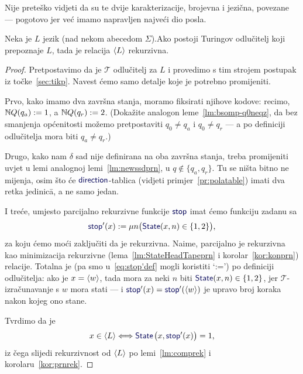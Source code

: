 Nije preteško vidjeti da su te dvije karakterizacije, brojevna i jezična, povezane --- pogotovo jer već imamo napravljen najveći dio posla.

\begin{teorem}[{name=[rekurzivnost Turing-odlučivog jezika]}]\label{tm:oikr}
    Neka je $L$ jezik (nad nekom abecedom $\Sigma$).\newline Ako postoji Turingov odlučitelj koji prepoznaje $L$, tada je relacija $\langle L\rangle$ rekurzivna.
\end{teorem}
\begin{proof}
Pretpostavimo da je $\mathcal T$ odlučitelj za $L$ i provedimo s tim strojem postupak iz točke~\ref{sec:tikp}. Navest ćemo samo detalje koje je potrebno promijeniti.

Prvo, kako imamo dva završna stanja, moramo fiksirati njihove kodove: recimo, ${\mathbb N} Q(q_a):=1$, a ${\mathbb N} Q(q_r):=2$. (Dokažite analogon leme~\ref{lm:bsomp-q0neqz}, da bez smanjenja općenitosti možemo pretpostaviti $q_0\ne q_a$ i $q_0\ne q_r$ --- a po definiciji odlučitelja mora biti $q_a\ne q_r$.)

    Drugo, kako nam $\delta$ sad nije definirana na oba završna stanja, treba promijeniti uvjet u lemi analognoj lemi~\ref{lm:newssdprn}, u $q\notin\{q_a,q_r\}$. Tu se ništa bitno ne mijenja, osim što će $\f{direction}$-tablica (vidjeti primjer~\ref{pr:polatable}) imati dva retka jedinic\=a, a ne samo jedan.

I treće, umjesto parcijalno rekurzivne funkcije $\f{stop}$ imat ćemo funkciju zadanu sa
\begin{equation}\label{eq:stop'def}
    \f{stop}'(x):=\mu n\bigl(\f{State}(x,n)\in\{1,2\}\bigr)\text,
\end{equation}
	za koju ćemo moći zaključiti da je rekurzivna. Naime, parcijalno je rekurzivna kao minimizacija rekurzivne (lema~\ref{lm:StateHeadTapeprn} i korolar~\ref{kor:konprn}) relacije. Totalna je (pa smo u~\eqref{eq:stop'def} mogli koristiti \enquote*{:=}) po definiciji odlučitelja: ako je $x=\langle w\rangle$, tada mora za neki $n$ biti $\f{State}(x,n)\in\{1,2\}$, jer $\mathcal T$\!-izračunavanje s $w$ mora stati --- i $\f{stop}'(x)=\f{stop}'(\kr w)$ je upravo broj koraka nakon kojeg ono stane.

Tvrdimo da je
\begin{equation}
	x\in\kr L\Longleftrightarrow\f{State}\mspace{2mu}\bigl(x,\f{stop}'(x)\bigr)=1\text,
\end{equation}
iz čega slijedi rekurzivnost od $\langle L\rangle$ po lemi~\ref{lm:comprek} i korolaru~\ref{kor:prnrek}.


\end{proof}
